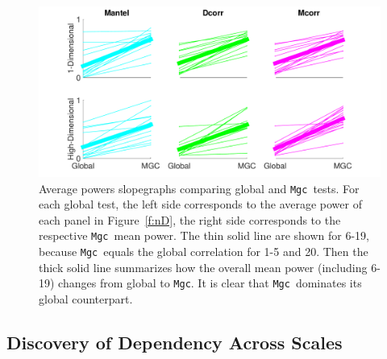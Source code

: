 \documentclass[11pt]{article}
\newcommand{\note}[2][]{\added[#1,remark={#2}]{}}
\providecommand{\sct}[1]{{\sc \texttt{#1}}}
\newcommand{\Mgc}{\sct{Mgc}}
\newcommand{\Mgcp}{\sct{Mgc$_P$}}
\newcommand{\Hhg}{\sct{Hhg}}
\newcommand{\Dcorr}{\sct{Dcorr}}
\newcommand{\Mcorr}{\sct{Mcorr}}
\newcommand{\Mantel}{\sct{Mantel}}
\newcommand{\cs}[1]{{\note{cs: #1}}}
\begin{document}
\begin{figure}
  \centering
  \includegraphics[width=1.0\textwidth]{../Figures/FigSlope}
  \caption{
Average powers slopegraphs comparing global and \Mgc~tests. For each global test,  the left side corresponds to the average power of each panel in Figure~\ref{f:nD}, the right side corresponds to the respective \Mgc~mean power. The thin solid line are shown for  6-19, because \Mgc~equals the global correlation for  1-5 and  20. Then the thick solid line summarizes how the overall mean power (including  6-19) changes from global to \Mgc.
It is clear that \Mgc~dominates its global counterpart. 
\cs{this caption is not right}
}
\label{f:pp}
\end{figure}





\subsection*{Discovery of Dependency Across Scales}
\label{main3}
\end{document}
